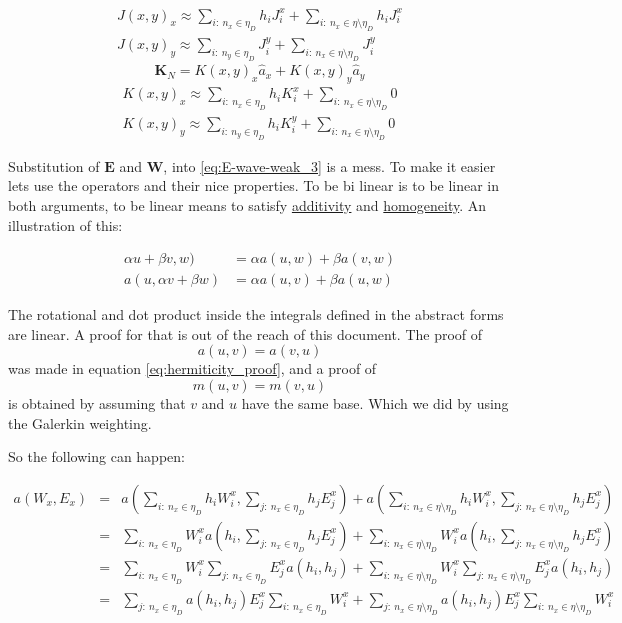 \begin{align*}
J(x,y)_x\approx \sum_{i:\ n_x \in \eta_D}h_i J_i^x+\sum_{i:\ n_x \in \eta\setminus\eta_D}h_i J_i^x \\
J(x,y)_y\approx \sum_{i:\ n_y \in \eta_D}J_i^y+
\sum_{i:\ n_x \in \eta\setminus\eta_D}J_i^y
\end{align*}
$$\mathbf{K}_N=K(x,y)_x\hat{a}_x + K(x,y)_y \hat{a}_y $$
\begin{align*}
K(x,y)_x\approx \sum_{i:\ n_x \in \eta_D}h_i K_i^x+\sum_{i:\ n_x \in \eta\setminus\eta_D} 0 \\
K(x,y)_y\approx \sum_{i:\ n_y \in \eta_D}h_i K_i^y+
\sum_{i:\ n_x \in \eta\setminus\eta_D} 0
\end{align*}

Substitution of $\mathbf{E}$ and $\mathbf{W}$, into \ref{eq:E-wave-weak_3} is a mess. To make it easier lets use the operators and their nice properties. To be bi linear is to be linear in both arguments, to be linear means to satisfy \href{http://en.wikipedia.org/wiki/Additive_function}{additivity} and \href{http://en.wikipedia.org/wiki/Homogeneous_function}{homogeneity}. An illustration of this:

\begin{align*}
\alpha u+\beta v, w)&=\alpha a(u,w)+\beta a(v,w)\\
a(u,\alpha v+\beta w)&=\alpha a(u,v)+\beta a(u,w)
\end{align*}

The rotational and dot product inside the integrals defined in the abstract forms are linear. A proof for that is out of the reach of this document. 
The proof of
\[a(u,v) = a(v,u)\]
was made in equation \ref{eq:hermiticity_proof}, and a proof of
\[m(u,v) = m(v,u)\]
is obtained by assuming that $v$ and $u$ have the same base. Which we did by using the Galerkin weighting.

So the following can happen:

\begin{align}
a\left(W_x,E_x\right)&=& a\left( \sum_{i:\ n_x \in \eta_D} h_i W_i^x, \sum_{j:\ n_x \in \eta_D} h_j E_j^x\right)+a\left(\sum_{i:\ n_x \in \eta\setminus\eta_D} h_i W_i^x,\sum_{j:\ n_x \in \eta\setminus\eta_D} h_j E_j^x\right)\nonumber \\
&=&  \sum_{i:\ n_x \in \eta_D}W_i^x a\left(  h_i , \sum_{j:\ n_x \in \eta_D} h_j E_j^x\right)+\sum_{i:\ n_x \in \eta\setminus\eta_D} W_i^x a\left( h_i,\sum_{j:\ n_x \in \eta\setminus\eta_D} h_j E_j^x\right)\nonumber\\
&=&\sum_{i:\ n_x \in \eta_D}W_i^x \sum_{j:\ n_x \in \eta_D}E_j^x a\left(  h_i ,  h_j \right)+\sum_{i:\ n_x \in \eta\setminus\eta_D} W_i^x \sum_{j:\ n_x \in \eta\setminus\eta_D}  E_j^x a\left( h_i, h_j \right)\nonumber\\
&=& \sum_{j:\ n_x \in \eta_D} a\left(  h_i ,  h_j \right)E_j^x \sum_{i:\ n_x \in \eta_D}W_i^x+\sum_{j:\ n_x \in \eta\setminus\eta_D}   a\left( h_i, h_j \right)E_j^x\sum_{i:\ n_x \in \eta\setminus\eta_D} W_i^x \label{eq:substitution_of_app_fields_in_a}
\end{align}

